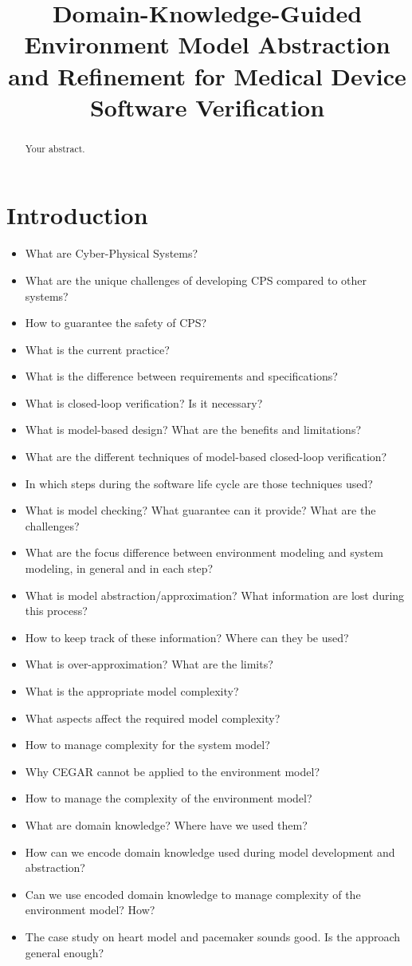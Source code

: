 \documentclass{llncs}
\title{Domain-Knowledge-Guided Environment Model Abstraction and Refinement for Medical Device Software Verification}
\begin{document}
\maketitle

\begin{abstract}
Your abstract.
\end{abstract}

\section{Introduction}
\begin{itemize}
	\item What are Cyber-Physical Systems?
    \item What are the unique challenges of developing CPS compared to other systems?
    \item How to guarantee the safety of CPS?
    \item What is the current practice?
    \item What is the difference between requirements and specifications?
    \item What is closed-loop verification? Is it necessary?
    \item What is model-based design? What are the benefits and limitations?
    \item What are the different techniques of model-based closed-loop verification? 
    \item In which steps during the software life cycle are those techniques used?
    \item What is model checking? What guarantee can it provide? What are the challenges?
    \item What are the focus difference between environment modeling and system modeling, in general and in each step?
    \item What is model abstraction/approximation? What information are lost during this process?
    \item How to keep track of these information? Where can they be used?
    \item What is over-approximation? What are the limits?
    \item What is the appropriate model complexity?
    \item What aspects affect the required model complexity?
    \item How to manage complexity for the system model?
    \item Why CEGAR cannot be applied to the environment model?
    \item How to manage the complexity of the environment model?
    \item What are domain knowledge? Where have we used them?
    \item How can we encode domain knowledge used during model development and abstraction?
    \item Can we use encoded domain knowledge to manage complexity of the environment model? How?
    \item The case study on heart model and pacemaker sounds good. Is the approach general enough?
\end{itemize}
\end{document}
